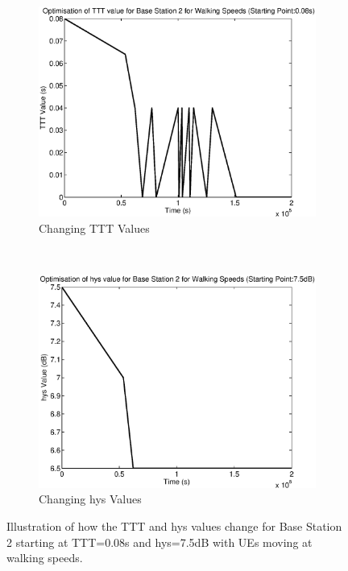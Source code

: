 \begin{figure}[H]
        \centering
        \begin{subfigure}[b]{0.49\textwidth}
                \includegraphics[width=\textwidth]{figures/graphs/walkhighhys/TTT2.eps}
                \caption{Changing TTT Values}
        \end{subfigure}%
        ~ %
        \begin{subfigure}[b]{0.49\textwidth}
                \includegraphics[width=\textwidth]{figures/graphs/walkhighhys/hys2.eps}
                \caption{Changing hys Values}
        \end{subfigure}
        \caption{Illustration of how the TTT and hys values change for Base Station 2 starting at TTT=0.08s and hys=7.5dB with UEs moving at walking speeds.}
\end{figure}
